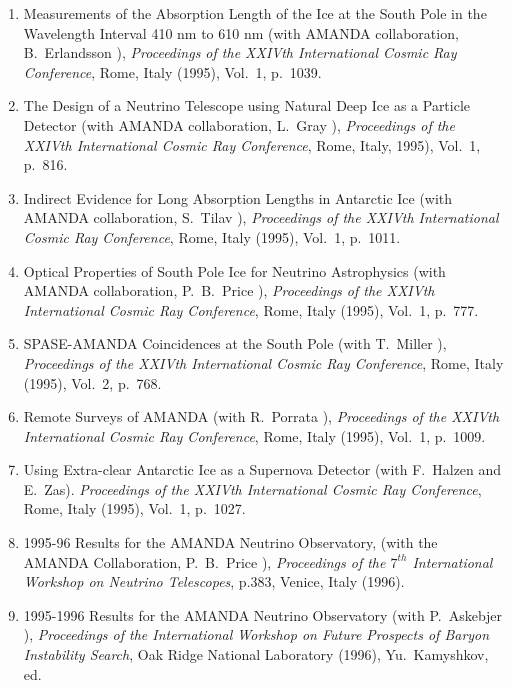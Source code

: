 \begin{enumerate}
\item Measurements of the Absorption Length of the Ice at the South
  Pole in the Wavelength Interval 410 nm to 610 nm (with AMANDA
  collaboration, B.~Erlandsson \etal), {\it Proceedings of the XXIVth
    International Cosmic Ray Conference}, Rome, Italy (1995), Vol.~1,
  p.~1039.

\item The Design of a Neutrino Telescope using Natural Deep Ice as a
  Particle Detector (with AMANDA collaboration, L.~Gray \etal), {\it
    Proceedings of the XXIVth International Cosmic Ray Conference},
  Rome, Italy, 1995), Vol.~1, p.~816.

\item Indirect Evidence for Long Absorption Lengths in Antarctic Ice
  (with AMANDA collaboration, S.~Tilav \etal), {\it Proceedings of the
  XXIVth International Cosmic Ray Conference}, Rome, Italy (1995),
  Vol.~1, p.~1011.

\item Optical Properties of South Pole Ice for Neutrino Astrophysics
  (with AMANDA collaboration, P.~B.~Price \etal), {\it Proceedings of
  the XXIVth International Cosmic Ray Conference}, Rome, Italy (1995),
  Vol.~1, p.~777.

\item SPASE-AMANDA Coincidences at the South Pole (with T.~Miller
  \etal), {\it Proceedings of the XXIVth International Cosmic Ray
    Conference}, Rome, Italy (1995), Vol.~2, p.~768.

\item Remote Surveys of AMANDA (with R.~Porrata \etal), {\it
  Proceedings of the XXIVth International Cosmic Ray Conference},
  Rome, Italy (1995), Vol.~1, p.~1009.

\item Using Extra-clear Antarctic Ice as a Supernova Detector (with
  F.~Halzen and E.~Zas).  {\it Proceedings of the XXIVth International
    Cosmic Ray Conference}, Rome, Italy (1995), Vol.~1, p.~1027.

\item 1995-96 Results for the AMANDA Neutrino Observatory, (with the
  AMANDA Collaboration, P.~B.~Price \etal), {\it Proceedings of the
    $7^{th}$ International Workshop on Neutrino Telescopes}, p.383,
  Venice, Italy (1996).

\item 1995-1996 Results for the AMANDA Neutrino Observatory (with
  P.~Askebjer \etal), {\it Proceedings of the International Workshop
    on Future Prospects of Baryon Instability Search}, Oak Ridge
  National Laboratory (1996), Yu.~Kamyshkov, ed.


\end{enumerate}
